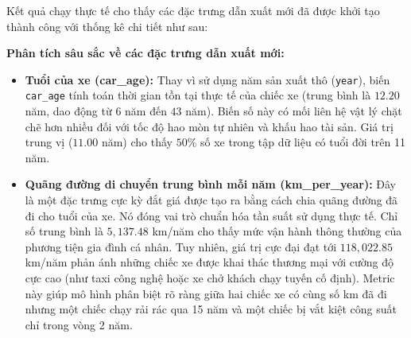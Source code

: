 Kết quả chạy thực tế cho thấy các đặc trưng dẫn xuất mới đã được khởi tạo thành công với thống kê chi tiết như sau:

\begin{table}[H]
    \centering
    \caption{Thống kê mô tả các đặc trưng sau khi dẫn xuất đặc trưng mới}
    \label{tab:derived_features_describe}
\end{table}

\textbf{Phân tích sâu sắc về các đặc trưng dẫn xuất mới:}
\begin{itemize}
    \item \textbf{Tuổi của xe (car\_age):} Thay vì sử dụng năm sản xuất thô (\texttt{year}), biến \texttt{car\_age} tính toán thời gian tồn tại thực tế của chiếc xe (trung bình là $12.20$ năm, dao động từ $6$ năm đến $43$ năm). Biến số này có mối liên hệ vật lý chặt chẽ hơn nhiều đối với tốc độ hao mòn tự nhiên và khấu hao tài sản. Giá trị trung vị ($11.00$ năm) cho thấy $50\%$ số xe trong tập dữ liệu có tuổi đời trên 11 năm.
    \item \textbf{Quãng đường di chuyển trung bình mỗi năm (km\_per\_year):} Đây là một đặc trưng cực kỳ đắt giá được tạo ra bằng cách chia quãng đường đã đi cho tuổi của xe. Nó đóng vai trò chuẩn hóa tần suất sử dụng thực tế. Chỉ số trung bình là $5,137.48$ km/năm cho thấy mức vận hành thông thường của phương tiện gia đình cá nhân. Tuy nhiên, giá trị cực đại đạt tới $118,022.85$ km/năm phản ánh những chiếc xe được khai thác thương mại với cường độ cực cao (như taxi công nghệ hoặc xe chở khách chạy tuyến cố định). Metric này giúp mô hình phân biệt rõ ràng giữa hai chiếc xe có cùng số km đã đi nhưng một chiếc chạy rải rác qua 15 năm và một chiếc bị vắt kiệt công suất chỉ trong vòng 2 năm.
\end{itemize}


